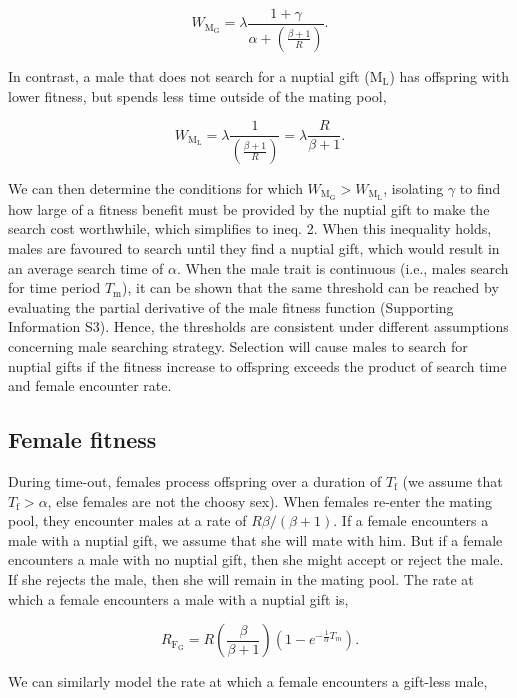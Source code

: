 \documentclass[
]{article}
\begin{document}
\[W_{\mathrm{M_{G}}} = \lambda \frac{1 + \gamma}{\alpha + \left( \frac{\beta + 1}{R} \right)}.\]

In contrast, a male that does not search for a nuptial gift
(\(\mathrm{M_{L}}\)) has offspring with lower fitness, but spends less
time outside of the mating pool,

\[W_{\mathrm{M_{L}}} = \lambda \frac{1}{\left(\frac{\beta+1}{R} \right)} = \lambda \frac{R}{\beta + 1}.\]

We can then determine the conditions for which
\(W_{\mathrm{M_{G}}} > W_{\mathrm{M_{L}}}\), isolating \(\gamma\) to
find how large of a fitness benefit must be provided by the nuptial gift
to make the search cost worthwhile, which simplifies to ineq. 2. When
this inequality holds, males are favoured to search until they find a
nuptial gift, which would result in an average search time of
\(\alpha\). When the male trait is continuous (i.e., males search for
time period \(T_{\mathrm{m}}\)), it can be shown that the same threshold
can be reached by evaluating the partial derivative of the male fitness
function (Supporting Information S3). Hence, the thresholds are
consistent under different assumptions concerning male searching
strategy. Selection will cause males to search for nuptial gifts if the
fitness increase to offspring exceeds the product of search time and
female encounter rate.

\hypertarget{female-fitness}{%
\subsection{Female fitness}\label{female-fitness}}

During time-out, females process offspring over a duration of
\(T_{\mathrm{f}}\) (we assume that \(T_{\mathrm{f}} > \alpha\), else
females are not the choosy sex). When females re-enter the mating pool,
they encounter males at a rate of \(R\beta/(\beta + 1)\). If a female
encounters a male with a nuptial gift, we assume that she will mate with
him. But if a female encounters a male with no nuptial gift, then she
might accept or reject the male. If she rejects the male, then she will
remain in the mating pool. The rate at which a female encounters a male
with a nuptial gift is,

\[R_{\mathrm{F_{G}}} = R \left(\frac{\beta}{\beta + 1}\right)\left(1 - e^{-\frac{1}{\alpha}T_{m}}\right).\]

We can similarly model the rate at which a female encounters a gift-less
male,
\end{document}
